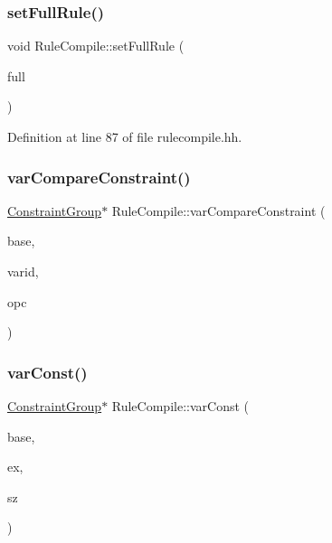 \subsubsection{\texorpdfstring{setFullRule()}{setFullRule()}}
{\footnotesize\ttfamily void Rule\+Compile\+::set\+Full\+Rule (\begin{DoxyParamCaption}\item[{\mbox{\hyperlink{class_constraint_group}{Constraint\+Group}} $\ast$}]{full }\end{DoxyParamCaption})\hspace{0.3cm}{\ttfamily [inline]}}



Definition at line 87 of file rulecompile.\+hh.

\mbox{\label{class_rule_compile_a5d24deccb7cae2c48208d9243fd515aa}} 
\subsubsection{\texorpdfstring{varCompareConstraint()}{varCompareConstraint()}}
{\footnotesize\ttfamily \mbox{\hyperlink{class_constraint_group}{Constraint\+Group}}$\ast$ Rule\+Compile\+::var\+Compare\+Constraint (\begin{DoxyParamCaption}\item[{\mbox{\hyperlink{class_constraint_group}{Constraint\+Group}} $\ast$}]{base,  }\item[{int4}]{varid,  }\item[{\mbox{\hyperlink{opcodes_8hh_abeb7dfb0e9e2b3114e240a405d046ea7}{Op\+Code}}}]{opc }\end{DoxyParamCaption})}

\mbox{\label{class_rule_compile_ab8273a9c72b40019fade0814a0ebd44d}} 
\subsubsection{\texorpdfstring{varConst()}{varConst()}}
{\footnotesize\ttfamily \mbox{\hyperlink{class_constraint_group}{Constraint\+Group}}$\ast$ Rule\+Compile\+::var\+Const (\begin{DoxyParamCaption}\item[{\mbox{\hyperlink{class_constraint_group}{Constraint\+Group}} $\ast$}]{base,  }\item[{\mbox{\hyperlink{class_r_h_s_constant}{R\+H\+S\+Constant}} $\ast$}]{ex,  }\item[{\mbox{\hyperlink{class_r_h_s_constant}{R\+H\+S\+Constant}} $\ast$}]{sz }\end{DoxyParamCaption})}

